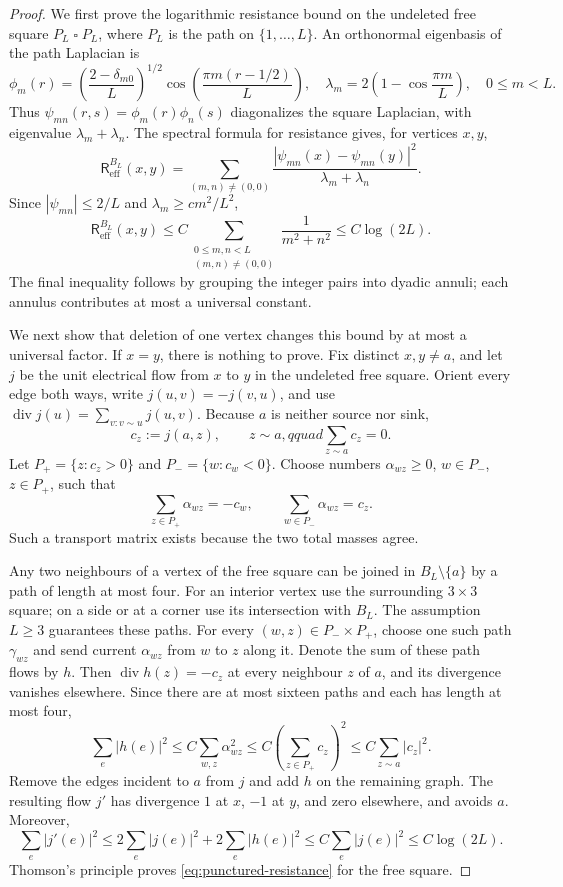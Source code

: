 \documentclass[11pt]{article}
\numberwithin{equation}{section}
\theoremstyle{remark}
\newcommand{\1}{\mathbf 1}
\begin{document}
\begin{proof}
We first prove the logarithmic resistance bound on the undeleted free
square \(P_L\mathbin\square P_L\), where \(P_L\) is the path on
\(\{1,\ldots,L\}\).  An orthonormal eigenbasis of the path Laplacian is
\[
 \phi_m(r)=\left(\frac{2-\delta_{m0}}L\right)^{1/2}
 \cos\!\left(\frac{\pi m(r-1/2)}L\right),
 \quad
 \lambda_m=2\left(1-\cos\frac{\pi m}L\right),
 \quad 0\leq m<L.
\]
Thus \(\psi_{mn}(r,s)=\phi_m(r)\phi_n(s)\) diagonalizes the square
Laplacian, with eigenvalue \(\lambda_m+\lambda_n\).  The spectral formula
for resistance gives, for vertices \(x,y\),
\[
 \mathsf R_{\mathrm{eff}}^{B_L}(x,y)
 =\sum_{(m,n)\ne(0,0)}
 \frac{|\psi_{mn}(x)-\psi_{mn}(y)|^2}{\lambda_m+\lambda_n}.
\]
Since \(|\psi_{mn}|\leq2/L\) and
\(\lambda_m\geq c m^2/L^2\),
\[
 \mathsf R_{\mathrm{eff}}^{B_L}(x,y)
 \leq C\sum_{\substack{0\leq m,n<L\\(m,n)\ne(0,0)}}
 \frac1{m^2+n^2}
 \leq C\log(2L).
\]
The final inequality follows by grouping the integer pairs into dyadic
annuli; each annulus contributes at most a universal constant.

We next show that deletion of one vertex changes this bound by at most a
universal factor.  If \(x=y\), there is nothing to prove.  Fix distinct
\(x,y\ne a\), and let \(j\) be the unit electrical flow from \(x\) to
\(y\) in the undeleted free square.  Orient every edge both ways, write
\(j(u,v)=-j(v,u)\), and use
\(\operatorname{div}j(u)=\sum_{v:v\sim u}j(u,v)\).  Because \(a\) is
neither source nor sink,
\[
 c_z:=j(a,z),\qquad z\sim a,qquad \sum_{z\sim a}c_z=0.
\]
Let \(P_+=\{z:c_z>0\}\) and \(P_-=\{w:c_w<0\}\).  Choose numbers
\(\alpha_{wz}\geq0\), \(w\in P_-\), \(z\in P_+\), such that
\[
 \sum_{z\in P_+}\alpha_{wz}=-c_w,
 \qquad
 \sum_{w\in P_-}\alpha_{wz}=c_z.
\]
Such a transport matrix exists because the two total masses agree.

Any two neighbours of a vertex of the free square can be joined in
\(B_L\setminus\{a\}\) by a path of length at most four.  For an interior
vertex use the surrounding \(3\times3\) square; on a side or at a corner
use its intersection with \(B_L\).  The assumption \(L\geq3\) guarantees
these paths.  For every \((w,z)\in P_-\times P_+\), choose one such path
\(\gamma_{wz}\) and send current \(\alpha_{wz}\) from \(w\) to \(z\)
along it.  Denote the sum of these path flows by \(h\).  Then
\(\operatorname{div}h(z)=-c_z\) at every neighbour \(z\) of \(a\), and
its divergence vanishes elsewhere.  Since there are at most sixteen
paths and each has length at most four,
\[
 \sum_e|h(e)|^2
 \leq C\sum_{w,z}\alpha_{wz}^2
 \leq C\left(\sum_{z\in P_+}c_z\right)^2
 \leq C\sum_{z\sim a}|c_z|^2.
\]
Remove the edges incident to \(a\) from \(j\) and add \(h\) on the
remaining graph.  The resulting flow \(j'\) has divergence \(1\) at
\(x\), \(-1\) at \(y\), and zero elsewhere, and avoids \(a\).  Moreover,
\[
 \sum_e|j'(e)|^2
 \leq2\sum_e|j(e)|^2+2\sum_e|h(e)|^2
 \leq C\sum_e|j(e)|^2
 \leq C\log(2L).
\]
Thomson's principle proves \eqref{eq:punctured-resistance} for the free
square.


\end{proof}
\end{document}
